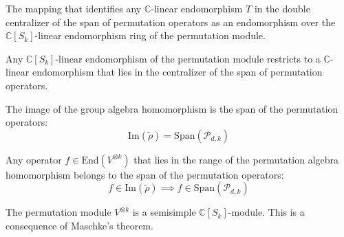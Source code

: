 \begin{definition}\label{def:doubleCentralizer_to_endEndModule}
  \leanok
  The mapping that identifies any $\mathbb{C}$-linear endomorphism $T$ in the double centralizer of the span of permutation operators as an endomorphism over the $\mathbb{C}[S_k]$-linear endomorphism ring of the permutation module.
\end{definition}

\begin{lemma}\label{lem:endModule_mem_centralizer}
  \leanok
  Any $\mathbb{C}[S_k]$-linear endomorphism of the permutation module restricts to a $\mathbb{C}$-linear endomorphism that lies in the centralizer of the span of permutation operators.
\end{lemma}

\begin{theorem}\label{thm:permAlgHom_range_eq}
  \leanok
  The image of the group algebra homomorphism is the span of the permutation operators:
  \begin{equation}
    \text{Im}(\tilde{\rho}) = \text{Span}(\mathcal{P}_{d,k})
  \end{equation}
\end{theorem}

\begin{lemma}\label{lem:mem_span_permImage_of_mem_range}
  \leanok
  Any operator $f \in \text{End}(V^{\otimes k})$ that lies in the range of the permutation algebra homomorphism belongs to the span of the permutation operators:
  \begin{equation}
    f \in \text{Im}(\tilde{\rho}) \implies f \in \text{Span}(\mathcal{P}_{d,k})
  \end{equation}
\end{lemma}

\begin{lemma}\label{lem:permModule_isSemisimple}
  \leanok
  The permutation module $V^{\otimes k}$ is a semisimple $\mathbb{C}[S_k]$-module. This is a consequence of Maschke's theorem.
\end{lemma}

